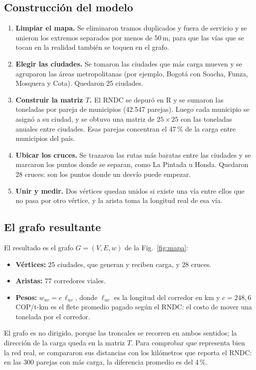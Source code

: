 \documentclass[conference]{IEEEtran}
\begin{document}
\subsection{Construcción del modelo}
\begin{enumerate}
    \item \textbf{Limpiar el mapa.} Se eliminaron tramos duplicados y fuera de
    servicio y se unieron los extremos separados por menos de 50\,m, para que
    las vías que se tocan en la realidad también se toquen en el grafo.
    \item \textbf{Elegir las ciudades.} Se tomaron las ciudades que más carga
    mueven y se agruparon las áreas metropolitanas (por ejemplo, Bogotá con
    Soacha, Funza, Mosquera y Cota). Quedaron 25 ciudades.
    \item \textbf{Construir la matriz $T$.} El RNDC se depuró en R y se sumaron
    las toneladas por pareja de municipios (42.547 parejas). Luego cada
    municipio se asignó a su ciudad, y se obtuvo una matriz de $25\times 25$
    con las toneladas anuales entre ciudades. Esas parejas concentran el
    47\,\% de la carga entre municipios del país.
    \item \textbf{Ubicar los cruces.} Se trazaron las rutas más baratas entre
    las ciudades y se marcaron los puntos donde se separan, como La Pintada u
    Honda. Quedaron 28 cruces: son los puntos donde un desvío puede empezar.
    \item \textbf{Unir y medir.} Dos vértices quedan unidos si existe una vía
    entre ellos que no pasa por otro vértice, y la arista toma la longitud real
    de esa vía.
\end{enumerate}

\subsection{El grafo resultante}
El resultado es el grafo $G=(V,E,w)$ de la Fig.~\ref{fig:mapa}:
\begin{itemize}
    \item \textbf{Vértices:} 25 ciudades, que generan y reciben carga, y 28
    cruces.
    \item \textbf{Aristas:} 77 corredores viales.
    \item \textbf{Pesos:} $w_{uv}=c\,\ell_{uv}$, donde $\ell_{uv}$ es la
    longitud del corredor en km y $c=248{,}6$ COP/t-km es el flete promedio
    pagado según el RNDC: el costo de mover una tonelada por el corredor.
\end{itemize}
El grafo es no dirigido, porque las troncales se recorren en ambos sentidos; la
dirección de la carga queda en la matriz $T$. Para comprobar que representa
bien la red real, se compararon sus distancias con los kilómetros que reporta
el RNDC: en las 300 parejas con más carga, la diferencia promedio es del
4\,\%.
\end{document}
